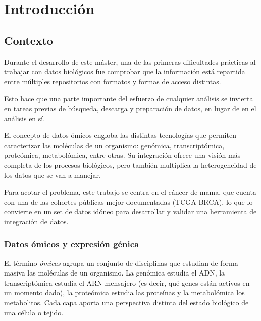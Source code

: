 \documentclass[12pt, a4paper]{report}
\begin{document}
\clearpage

\tableofcontents
\clearpage

\listoffigures
\clearpage

\listoftables
\clearpage


\chapter{Introducción}

\section{Contexto}

Durante el desarrollo de este máster, una de las primeras dificultades prácticas al trabajar con datos biológicos fue comprobar que la información está repartida entre múltiples repositorios con formatos y formas de acceso distintas.

Esto hace que una parte importante del esfuerzo de cualquier análisis se invierta en tareas previas de búsqueda, descarga y preparación de datos, en lugar de en el análisis en sí.

El concepto de datos ómicos engloba las distintas tecnologías que permiten caracterizar las moléculas de un organismo: genómica, transcriptómica, proteómica, metabolómica, entre otras. Su integración ofrece una visión más completa de los procesos biológicos, pero también multiplica la heterogeneidad de los datos que se van a manejar.

Para acotar el problema, este trabajo se centra en el cáncer de mama, que cuenta con una de las cohortes públicas mejor documentadas (TCGA-BRCA), lo que lo convierte en un set de datos idóneo para desarrollar y validar una herramienta de integración de datos.


\subsection{Datos ómicos y expresión génica}

El término \textit{ómicas} agrupa un conjunto de disciplinas que estudian de forma masiva las moléculas de un organismo. La genómica estudia el ADN, la transcriptómica estudia el ARN mensajero (es decir, qué genes están activos en un momento dado), la proteómica estudia las proteínas y la metabolómica los metabolitos. Cada capa aporta una perspectiva distinta del estado biológico de una célula o tejido.
\end{document}
